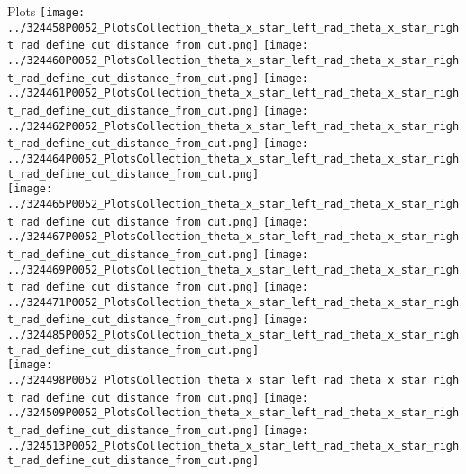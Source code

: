 \documentclass{beamer}
\begin{document}
\begin{frame}\tiny
        \begin{block}{Plots}
		  \centering
                \texttt{[image: ../324458P0052\_PlotsCollection\_theta\_x\_star\_left\_rad\_theta\_x\_star\_right\_rad\_define\_cut\_distance\_from\_cut.png]}
                \texttt{[image: ../324460P0052\_PlotsCollection\_theta\_x\_star\_left\_rad\_theta\_x\_star\_right\_rad\_define\_cut\_distance\_from\_cut.png]}
                \texttt{[image: ../324461P0052\_PlotsCollection\_theta\_x\_star\_left\_rad\_theta\_x\_star\_right\_rad\_define\_cut\_distance\_from\_cut.png]}
                \texttt{[image: ../324462P0052\_PlotsCollection\_theta\_x\_star\_left\_rad\_theta\_x\_star\_right\_rad\_define\_cut\_distance\_from\_cut.png]}
                \texttt{[image: ../324464P0052\_PlotsCollection\_theta\_x\_star\_left\_rad\_theta\_x\_star\_right\_rad\_define\_cut\_distance\_from\_cut.png]}\\
                \texttt{[image: ../324465P0052\_PlotsCollection\_theta\_x\_star\_left\_rad\_theta\_x\_star\_right\_rad\_define\_cut\_distance\_from\_cut.png]}
                \texttt{[image: ../324467P0052\_PlotsCollection\_theta\_x\_star\_left\_rad\_theta\_x\_star\_right\_rad\_define\_cut\_distance\_from\_cut.png]}
                \texttt{[image: ../324469P0052\_PlotsCollection\_theta\_x\_star\_left\_rad\_theta\_x\_star\_right\_rad\_define\_cut\_distance\_from\_cut.png]}
                \texttt{[image: ../324471P0052\_PlotsCollection\_theta\_x\_star\_left\_rad\_theta\_x\_star\_right\_rad\_define\_cut\_distance\_from\_cut.png]}
                \texttt{[image: ../324485P0052\_PlotsCollection\_theta\_x\_star\_left\_rad\_theta\_x\_star\_right\_rad\_define\_cut\_distance\_from\_cut.png]}\\
                \texttt{[image: ../324498P0052\_PlotsCollection\_theta\_x\_star\_left\_rad\_theta\_x\_star\_right\_rad\_define\_cut\_distance\_from\_cut.png]}
                \texttt{[image: ../324509P0052\_PlotsCollection\_theta\_x\_star\_left\_rad\_theta\_x\_star\_right\_rad\_define\_cut\_distance\_from\_cut.png]}
                \texttt{[image: ../324513P0052\_PlotsCollection\_theta\_x\_star\_left\_rad\_theta\_x\_star\_right\_rad\_define\_cut\_distance\_from\_cut.png]}

\end{block}
\end{frame}
\end{document}
